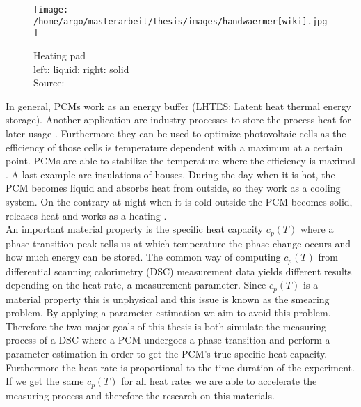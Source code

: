\documentclass{scrartcl}[12pt, halfparskip]
\numberwithin{equation}{section}
\numberwithin{figure}{section}
\numberwithin{table}{section}
\begin{document}
\begin{wrapfigure}{l}{0.4\textwidth}
	\texttt{[image: /home/argo/masterarbeit/thesis/images/handwaermer[wiki].jpg]}
	\caption{Heating pad \\ left: liquid; right: solid \\
		Source: \cite{heating_pad_image}}
	\label{fig:heating_pad}
\end{wrapfigure}


In general, PCMs work as an energy buffer (LHTES: Latent heat thermal energy storage). Another application are industry processes to store the process heat for later usage \cite{pcm_process_heat}. Furthermore they can be used to optimize  photovoltaic cells as the efficiency of those cells is temperature dependent with a maximum at a certain point. PCMs are able to stabilize the temperature where the efficiency is maximal \cite{pcm_solar_cells}. 
A last example are insulations of houses. During the day when it is hot, the PCM becomes liquid and absorbs heat from outside, so they work as a cooling system. On the contrary at night when it is cold outside the PCM becomes solid, releases heat and works as a heating \cite{pcm_house_insulation}. \\
An important material property is the specific heat capacity $c_p(T)$ where a phase transition peak tells us at which temperature the phase change occurs and how much energy can be stored. The common way of computing $c_p(T)$ from differential scanning calorimetry (DSC) measurement data yields different results depending on the heat rate, a measurement parameter. Since $c_p(T)$ is a material property this is unphysical and this issue is known as the smearing problem. By applying a parameter estimation we aim to avoid this problem.
Therefore the two major goals of this thesis is both simulate the measuring process of a DSC where a PCM undergoes a phase transition and perform a parameter estimation in order to get the PCM's true specific heat capacity. 
Furthermore the heat rate is proportional to the time duration of the experiment. If we get the same $c_p(T)$ for all heat rates we are able to accelerate the measuring process and therefore the research on this materials.
\end{document}
